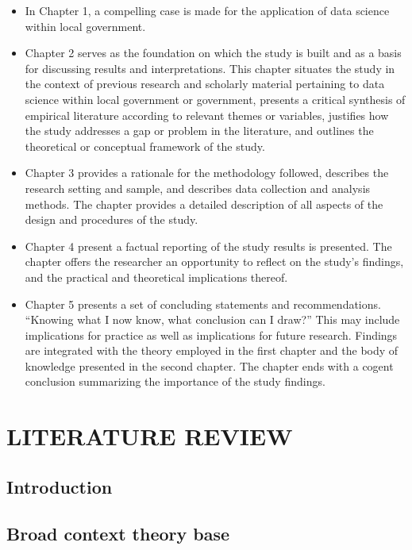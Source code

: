 \documentclass[]{book}
\theoremstyle{definition}
\theoremstyle{definition}
\theoremstyle{definition}
\theoremstyle{remark}
\begin{document}
\begin{itemize}
\item
  In Chapter 1, a compelling case is made for the application of data
  science within local government.
\item
  Chapter 2 serves as the foundation on which the study is built and as
  a basis for discussing results and interpretations. This chapter
  situates the study in the context of previous research and scholarly
  material pertaining to data science within local government or
  government, presents a critical synthesis of empirical literature
  according to relevant themes or variables, justifies how the study
  addresses a gap or problem in the literature, and outlines the
  theoretical or conceptual framework of the study.
\item
  Chapter 3 provides a rationale for the methodology followed, describes
  the research setting and sample, and describes data collection and
  analysis methods. The chapter provides a detailed description of all
  aspects of the design and procedures of the study.
\item
  Chapter 4 present a factual reporting of the study results is
  presented. The chapter offers the researcher an opportunity to reflect
  on the study's findings, and the practical and theoretical
  implications thereof.
\item
  Chapter 5 presents a set of concluding statements and recommendations.
  ``Knowing what I now know, what conclusion can I draw?'' This may
  include implications for practice as well as implications for future
  research. Findings are integrated with the theory employed in the
  first chapter and the body of knowledge presented in the second
  chapter. The chapter ends with a cogent conclusion summarizing the
  importance of the study findings.
\end{itemize}

\chapter{LITERATURE REVIEW}\label{literature-review}

\section{Introduction}\label{introduction-1}

\section{Broad context theory base}\label{broad-context-theory-base}
\end{document}
